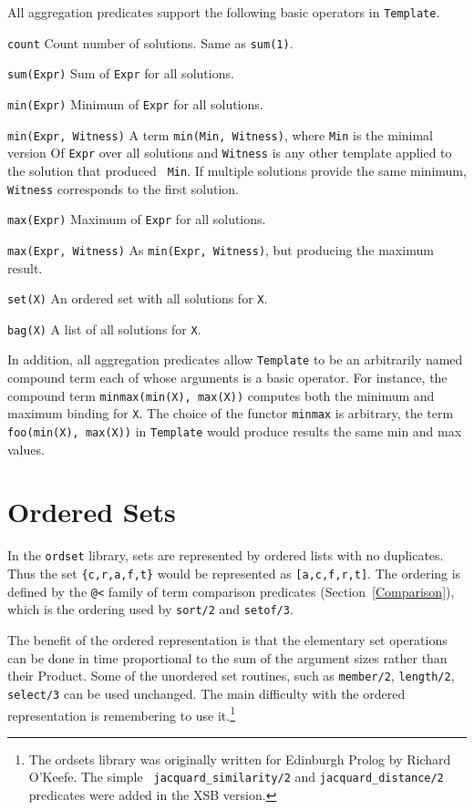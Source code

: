 All aggregation predicates support the following basic operators in
{\tt Template}.
\bi
\item  {\tt count}
	Count number of solutions.  Same as {\tt sum(1)}.
\item {\tt sum(Expr)}
	Sum of {\tt Expr} for all solutions.
\item  {\tt min(Expr)}
	Minimum of {\tt Expr} for all solutions.
\item {\tt min(Expr, Witness)}
%
       A term {\tt min(Min, Witness)}, where {\tt Min} is the minimal
       version Of {\tt Expr} over all solutions and {\tt Witness} is
       any other template applied to the solution that produced {\tt
         Min}.  If multiple solutions provide the same minimum,
       {\tt Witness} corresponds to the first solution.
\item  {\tt max(Expr)}
	Maximum of {\tt Expr} for all solutions.
\item  {\tt max(Expr, Witness)}
	As {\tt min(Expr, Witness)}, but producing the maximum result.
\item  {\tt set(X)}
	An ordered set with all solutions for {\tt X}.
\item  {\tt bag(X)}
	A list of all solutions for {\tt X}.
\ei

In addition, all aggregation predicates allow {\tt Template} to be an
arbitrarily named compound term each of whose arguments is a basic
operator.  For instance, the compound term {\tt minmax(min(X),
  max(X))} computes both the minimum and maximum binding for {\tt X}.
The choice of the functor {\tt minmax} is arbitrary, the term {\tt
  foo(min(X), max(X))} in {\tt Template} would produce results the
same min and max values.

\section{Ordered Sets}

In the {\tt ordset} library, sets are represented by ordered lists
with no duplicates.  Thus the set {\tt \{c,r,a,f,t\}} would be
represented as \verb|[a,c,f,r,t]|.  The ordering is defined by the
\verb|@<| family of term comparison predicates
(Section~\ref{Comparison}), which is the ordering used by {\tt sort/2}
and {\tt setof/3}.

The benefit of the ordered representation is that the elementary set
operations can be done in time proportional to the sum of the argument
sizes rather than their Product.  Some of the unordered set routines,
such as {\tt member/2}, {\tt length/2}, {\tt select/3} can be used
unchanged.  The main difficulty with the ordered representation is
remembering to use it.\footnote{The ordsets library was originally
  written for Edinburgh Prolog by Richard O'Keefe.  The simple {\tt
    jacquard\_similarity/2} and {\tt jacquard\_distance/2} predicates
  were added in the XSB version.}

